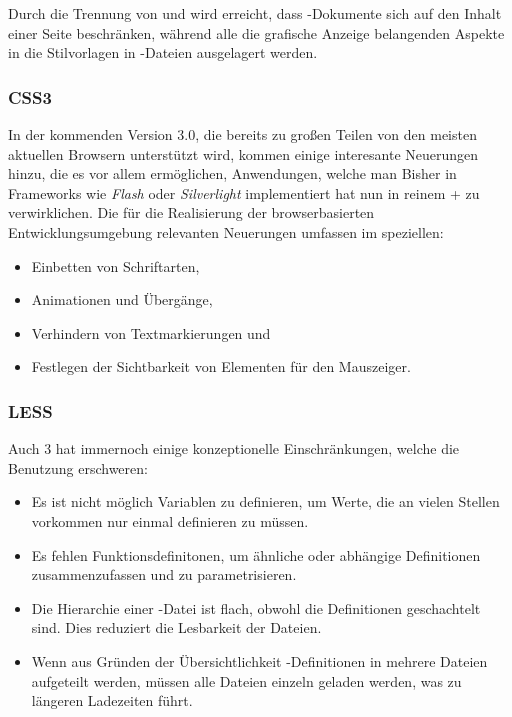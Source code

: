 Durch die Trennung von  und  wird erreicht, dass -Dokumente sich auf
den Inhalt einer Seite beschränken, während alle die grafische Anzeige  belangenden Aspekte in die
Stilvorlagen in -Dateien ausgelagert  werden.

\subsubsection{CSS3}
\label{sec:css3}

In der kommenden  Version 3.0, die bereits zu großen Teilen von den meisten aktuellen
Browsern unterstützt wird, kommen einige interesante Neuerungen hinzu, die es vor allem ermöglichen,
Anwendungen, welche man Bisher in Frameworks wie \textit{Flash} oder \textit{Silverlight}
implementiert hat nun in reinem + zu verwirklichen. Die für die Realisierung der
browserbasierten Entwicklungsumgebung relevanten Neuerungen umfassen im speziellen:

\begin{itemize}
  \item Einbetten von Schriftarten,
  \item Animationen und Übergänge,
  \item Verhindern von Textmarkierungen und
  \item Festlegen der Sichtbarkeit von Elementen für den Mauszeiger.
\end{itemize}

\subsubsection{LESS}

\label{sec:less}

Auch 3 hat immernoch einige konzeptionelle Einschränkungen, welche die Benutzung
erschweren:

\begin{itemize} 
  \item Es ist nicht möglich Variablen zu definieren, um Werte, die an
vielen Stellen vorkommen nur einmal definieren zu müssen. 
  \item Es fehlen Funktionsdefinitonen, um ähnliche
oder abhängige Definitionen  zusammenzufassen und zu parametrisieren. 
  \item Die Hierarchie einer
-Datei ist flach, obwohl die Definitionen geschachtelt sind. Dies reduziert die Lesbarkeit
der Dateien. 
  \item Wenn aus Gründen der Übersichtlichkeit -Definitionen in mehrere Dateien aufgeteilt
werden, müssen alle Dateien einzeln geladen werden, was zu längeren Ladezeiten führt. \end{itemize}

